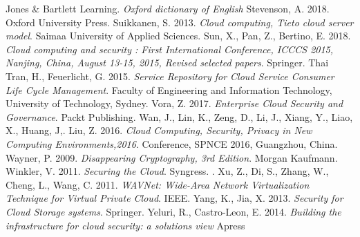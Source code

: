 \documentclass{article}
\begin{document}
\begin{thebibliography}{9}
        Jones \& Bartlett Learning.
	\textit{Oxford dictionary of English}
	Stevenson, A.
	2018.
	Oxford University Press.
        Suikkanen, S.
        2013.
	\textit{Cloud computing, Tieto cloud server model}.
        Saimaa University of Applied Sciences.
        Sun, X.,
        Pan, Z.,
        Bertino, E.
        2018.
	\textit{Cloud computing and security : First International Conference, ICCCS 2015, Nanjing, China, August 13-15, 2015, Revised selected papers}.
	Springer.
        Thai Tran, H.,
        Feuerlicht, G.
        2015.
        \textit{Service Repository for Cloud Service Consumer Life Cycle Management}.
	Faculty of Engineering and Information Technology,
        University of Technology, Sydney.
        Vora, Z.
        2017.
	\textit{Enterprise Cloud Security and Governance}.
	Packt Publishing.
        Wan, J.,
        Lin, K.,
        Zeng, D.,
        Li, J.,
        Xiang, Y.,
        Liao, X.,
        Huang, J,.
        Liu, Z.
        2016.
        \textit{Cloud Computing, Security, Privacy in New Computing Environments,2016}.
	Conference, SPNCE 2016, Guangzhou, China.
        Wayner, P.
        2009.
	\textit{Disappearing Cryptography, 3rd Edition}.
        Morgan Kaufmann.
        Winkler, V.
	2011.
	\textit{Securing the Cloud}.
        Syngress.
.
        Xu, Z.,
        Di, S.,
        Zhang, W.,
        Cheng, L.,
        Wang, C.
	2011.
        \textit{WAVNet: Wide-Area Network Virtualization Technique for Virtual Private Cloud}.
        IEEE.
        Yang, K.,
	Jia, X.
        2013.
	\textit{Security for Cloud Storage systems}.
        Springer.
        Yeluri, R.,
        Castro-Leon, E.
        2014.
	\textit{Building the infrastructure for cloud security: a solutions view}
        Apress

\end{thebibliography}
\end{document}
